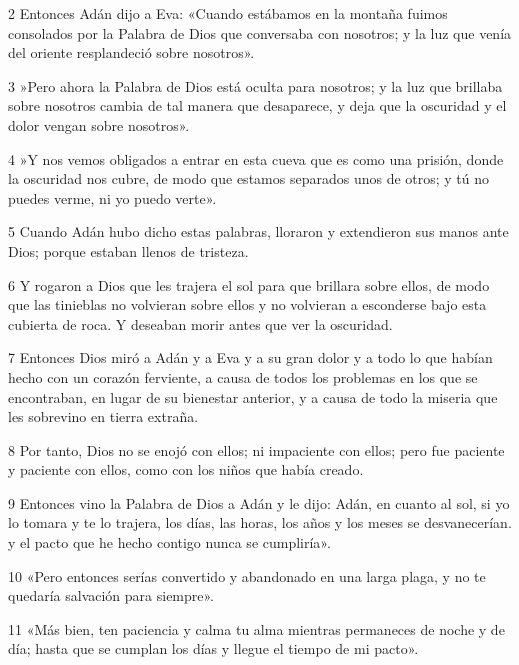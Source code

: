 \par 2 Entonces Adán dijo a Eva: «Cuando estábamos en la montaña fuimos consolados por la Palabra de Dios que conversaba con nosotros; y la luz que venía del oriente resplandeció sobre nosotros».

\par 3 »Pero ahora la Palabra de Dios está oculta para nosotros; y la luz que brillaba sobre nosotros cambia de tal manera que desaparece, y deja que la oscuridad y el dolor vengan sobre nosotros».

\par 4 »Y nos vemos obligados a entrar en esta cueva que es como una prisión, donde la oscuridad nos cubre, de modo que estamos separados unos de otros; y tú no puedes verme, ni yo puedo verte».

\par 5 Cuando Adán hubo dicho estas palabras, lloraron y extendieron sus manos ante Dios; porque estaban llenos de tristeza.

\par 6 Y rogaron a Dios que les trajera el sol para que brillara sobre ellos, de modo que las tinieblas no volvieran sobre ellos y no volvieran a esconderse bajo esta cubierta de roca. Y deseaban morir antes que ver la oscuridad.

\par 7 Entonces Dios miró a Adán y a Eva y a su gran dolor y a todo lo que habían hecho con un corazón ferviente, a causa de todos los problemas en los que se encontraban, en lugar de su bienestar anterior, y a causa de todo la miseria que les sobrevino en tierra extraña.

\par 8 Por tanto, Dios no se enojó con ellos; ni impaciente con ellos; pero fue paciente y paciente con ellos, como con los niños que había creado.

\par 9 Entonces vino la Palabra de Dios a Adán y le dijo: Adán, en cuanto al sol, si yo lo tomara y te lo trajera, los días, las horas, los años y los meses se desvanecerían. y el pacto que he hecho contigo nunca se cumpliría».

\par 10 «Pero entonces serías convertido y abandonado en una larga plaga, y no te quedaría salvación para siempre».

\par 11 «Más bien, ten paciencia y calma tu alma mientras permaneces de noche y de día; hasta que se cumplan los días y llegue el tiempo de mi pacto».

